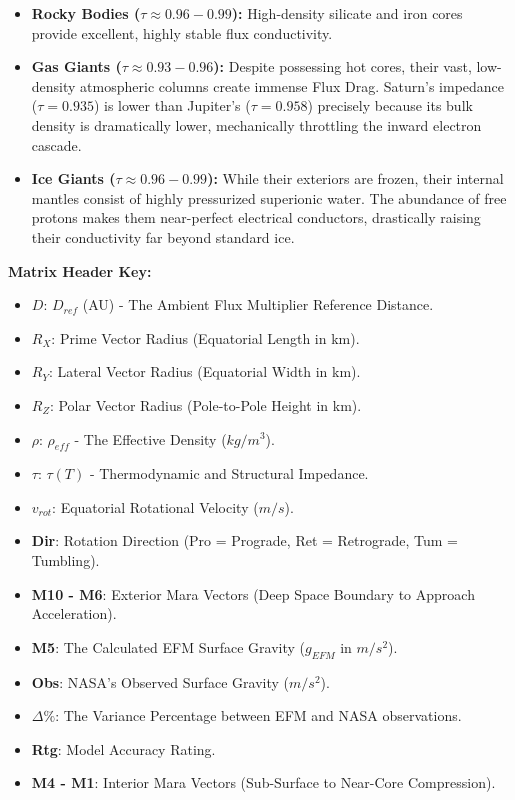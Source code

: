 \documentclass[11pt, a4paper]{article}
\begin{document}
\begin{itemize}
  \item \textbf{Rocky Bodies ($\tau \approx 0.96 - 0.99$):} High-density silicate and iron cores provide excellent, highly stable flux conductivity.
  \item \textbf{Gas Giants ($\tau \approx 0.93 - 0.96$):} Despite possessing hot cores, their vast, low-density atmospheric columns create immense Flux Drag. Saturn's impedance ($\tau = 0.935$) is lower than Jupiter's ($\tau = 0.958$) precisely because its bulk density is dramatically lower, mechanically throttling the inward electron cascade.
  \item \textbf{Ice Giants ($\tau \approx 0.96 - 0.99$):} While their exteriors are frozen, their internal mantles consist of highly pressurized superionic water. The abundance of free protons makes them near-perfect electrical conductors, drastically raising their conductivity far beyond standard ice.
\end{itemize}

\vspace{1em}
\noindent
\textbf{Matrix Header Key:}
\begin{itemize}
  \setlength{\itemsep}{0pt}
  \item \textbf{$D$}: $D_{ref}$ (AU) - The Ambient Flux Multiplier Reference Distance.
  \item \textbf{$R_X$}: Prime Vector Radius (Equatorial Length in km).
  \item \textbf{$R_Y$}: Lateral Vector Radius (Equatorial Width in km).
  \item \textbf{$R_Z$}: Polar Vector Radius (Pole-to-Pole Height in km).
  \item \textbf{$\rho$}: $\rho_{eff}$ - The Effective Density ($kg/m^3$).
  \item \textbf{$\tau$}: $\tau(T)$ - Thermodynamic and Structural Impedance.
  \item \textbf{$v_{rot}$}: Equatorial Rotational Velocity ($m/s$).
  \item \textbf{Dir}: Rotation Direction (Pro = Prograde, Ret = Retrograde, Tum = Tumbling).
  \item \textbf{M10 - M6}: Exterior Mara Vectors (Deep Space Boundary to Approach Acceleration).
  \item \textbf{M5}: The Calculated EFM Surface Gravity ($g_{EFM}$ in $m/s^2$).
  \item \textbf{Obs}: NASA's Observed Surface Gravity ($m/s^2$).
  \item \textbf{$\Delta\%$}: The Variance Percentage between EFM and NASA observations.
  \item \textbf{Rtg}: Model Accuracy Rating.
  \item \textbf{M4 - M1}: Interior Mara Vectors (Sub-Surface to Near-Core Compression).
\end{itemize}
\end{document}
